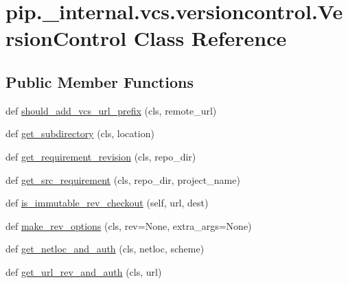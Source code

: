 \hypertarget{classpip_1_1__internal_1_1vcs_1_1versioncontrol_1_1VersionControl}{}\section{pip.\+\_\+internal.\+vcs.\+versioncontrol.\+Version\+Control Class Reference}
\label{classpip_1_1__internal_1_1vcs_1_1versioncontrol_1_1VersionControl}
\subsection*{Public Member Functions}
\begin{DoxyCompactItemize}
\item 
def \hyperlink{classpip_1_1__internal_1_1vcs_1_1versioncontrol_1_1VersionControl_a8110f667d528e6eefaec84f03c45a119}{should\+\_\+add\+\_\+vcs\+\_\+url\+\_\+prefix} (cls, remote\+\_\+url)
\item 
def \hyperlink{classpip_1_1__internal_1_1vcs_1_1versioncontrol_1_1VersionControl_aad50e3dac6134ca61cc1ce324a415917}{get\+\_\+subdirectory} (cls, location)
\item 
def \hyperlink{classpip_1_1__internal_1_1vcs_1_1versioncontrol_1_1VersionControl_a603f9575e454d2e9e33187bf6defbe75}{get\+\_\+requirement\+\_\+revision} (cls, repo\+\_\+dir)
\item 
def \hyperlink{classpip_1_1__internal_1_1vcs_1_1versioncontrol_1_1VersionControl_af553cdbbd76df3c46d2cf81f21421473}{get\+\_\+src\+\_\+requirement} (cls, repo\+\_\+dir, project\+\_\+name)
\item 
def \hyperlink{classpip_1_1__internal_1_1vcs_1_1versioncontrol_1_1VersionControl_a19ef60228604ee6f0f53e9049b986bb1}{is\+\_\+immutable\+\_\+rev\+\_\+checkout} (self, url, dest)
\item 
def \hyperlink{classpip_1_1__internal_1_1vcs_1_1versioncontrol_1_1VersionControl_a5a2074f207d613571adc340a5aa0d345}{make\+\_\+rev\+\_\+options} (cls, rev=None, extra\+\_\+args=None)
\item 
def \hyperlink{classpip_1_1__internal_1_1vcs_1_1versioncontrol_1_1VersionControl_a74908511db23ef2cd1e06fbb5743737a}{get\+\_\+netloc\+\_\+and\+\_\+auth} (cls, netloc, scheme)
\item 
def \hyperlink{classpip_1_1__internal_1_1vcs_1_1versioncontrol_1_1VersionControl_aa6e993d15b1bfafccdc290582d116a3e}{get\+\_\+url\+\_\+rev\+\_\+and\+\_\+auth} (cls, url)
\item 

\end{DoxyCompactItemize}
